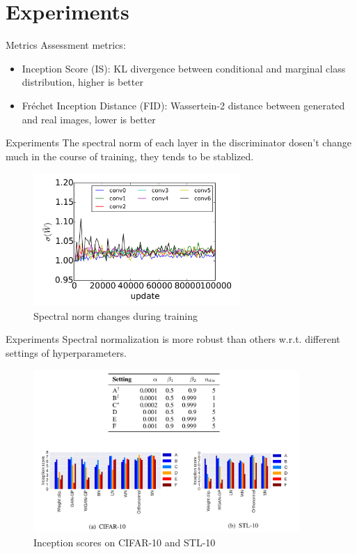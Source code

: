 \documentclass[xcolor={svgnames}]{beamer}
\begin{document}
\section{Experiments}
\begin{frame}{Metrics}
  Assessment metrics:
  \begin{itemize}
    \item Inception Score (IS)\cite{salimans2016improved}: KL divergence 
          between conditional and marginal class distribution, higher is better
    \item Fréchet Inception Distance (FID)\cite{heusel2017gans}: Wassertein-2
          distance between generated and real images, lower is better
  \end{itemize}
\end{frame}
\begin{frame}{Experiments}
  The spectral norm of each layer in the discriminator dosen't change much
  in the course of training, they tends to be stablized.
  \begin{figure}[bp]
    \centering
    \includegraphics[width=0.7\textwidth]{figures/sn-change.png}
    \caption{Spectral norm changes during training}
    \label{fig:sn-change}
  \end{figure}
\end{frame}
\begin{frame}{Experiments}
  Spectral normalization is more robust than others w.r.t. different
  settings of hyperparameters.
  \begin{figure}[bp]
    \centering
    \includegraphics[width=0.9\textwidth]{figures/inception-score.png}
    \caption{Inception scores on CIFAR-10 and STL-10}
    \label{fig:is}
  \end{figure}
\end{frame}
\end{document}
